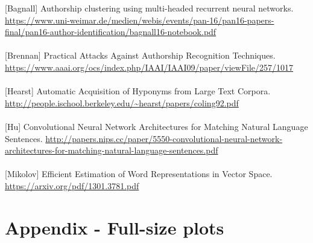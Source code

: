 \documentclass[12pt]{article}
\begin{document}
[Bagnall] Authorship clustering using multi-headed recurrent
neural networks. \url{https://www.uni-weimar.de/medien/webis/events/pan-16/pan16-papers-final/pan16-author-identification/bagnall16-notebook.pdf}\\ \\

[Brennan] Practical Attacks Against Authorship Recognition Techniques. \url{https://www.aaai.org/ocs/index.php/IAAI/IAAI09/paper/viewFile/257/1017}\\ \\

[Hearst] Automatic Acquisition of Hyponyms
from Large Text Corpora. \url{http://people.ischool.berkeley.edu/~hearst/papers/coling92.pdf}\\ \\

[Hu] Convolutional Neural Network Architectures for
Matching Natural Language Sentences. \url{http://papers.nips.cc/paper/5550-convolutional-neural-network-architectures-for-matching-natural-language-sentences.pdf}\\ \\


[Mikolov] Efficient Estimation of Word Representations in
Vector Space. \url{https://arxiv.org/pdf/1301.3781.pdf}




\section{Appendix - Full-size plots}
\end{document}
